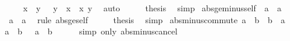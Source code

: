 \begin{isabellebody}
%
\isadelimproof
%
\endisadelimproof
%
\isatagproof
{}\isamarkupfalse%
\ {\isacharminus}{\kern0pt}\isanewline
\ \ \isamarkupfalse%
\ {\isachardoublequoteopen}x\ {\isasymle}\ y\ {\isasymLongrightarrow}\ {\isasymnot}\ y\ {\isacharless}{\kern0pt}\ x{\isachardoublequoteclose}\ \ x\ y\ \isamarkupfalse%
\ auto\isanewline
\ \ \isamarkupfalse%
\ \isamarkupfalse%
\ {\isacharquery}{\kern0pt}thesis\ \isamarkupfalse%
\ simp\isanewline
{}\isamarkupfalse%
%
\endisatagproof
{\isafoldproof}%
%
\isadelimproof
\isanewline
%
\endisadelimproof
\isanewline
{}\isamarkupfalse%
\ abs{\isacharunderscore}{\kern0pt}ge{\isacharunderscore}{\kern0pt}minus{\isacharunderscore}{\kern0pt}self{\isacharcolon}{\kern0pt}\ {\isachardoublequoteopen}{\isacharminus}{\kern0pt}\ a\ {\isasymle}\ {\isasymbar}a{\isasymbar}{\isachardoublequoteclose}\isanewline
%
\isadelimproof
%
\endisadelimproof
%
\isatagproof
{}\isamarkupfalse%
\ {\isacharminus}{\kern0pt}\isanewline
\ \ \isamarkupfalse%
\ {\isachardoublequoteopen}{\isacharminus}{\kern0pt}\ a\ {\isasymle}\ {\isasymbar}{\isacharminus}{\kern0pt}a{\isasymbar}{\isachardoublequoteclose}\ \isamarkupfalse%
\ {\isacharparenleft}{\kern0pt}rule\ abs{\isacharunderscore}{\kern0pt}ge{\isacharunderscore}{\kern0pt}self{\isacharparenright}{\kern0pt}\isanewline
\ \ \isamarkupfalse%
\ \isamarkupfalse%
\ {\isacharquery}{\kern0pt}thesis\ \isamarkupfalse%
\ simp\isanewline
{}\isamarkupfalse%
%
\endisatagproof
{\isafoldproof}%
%
\isadelimproof
\isanewline
%
\endisadelimproof
\isanewline
{}\isamarkupfalse%
\ abs{\isacharunderscore}{\kern0pt}minus{\isacharunderscore}{\kern0pt}commute{\isacharcolon}{\kern0pt}\ {\isachardoublequoteopen}{\isasymbar}a\ {\isacharminus}{\kern0pt}\ b{\isasymbar}\ {\isacharequal}{\kern0pt}\ {\isasymbar}b\ {\isacharminus}{\kern0pt}\ a{\isasymbar}{\isachardoublequoteclose}\isanewline
%
\isadelimproof
%
\endisadelimproof
%
\isatagproof
{}\isamarkupfalse%
\ {\isacharminus}{\kern0pt}\isanewline
\ \ \isamarkupfalse%
\ {\isachardoublequoteopen}{\isasymbar}a\ {\isacharminus}{\kern0pt}\ b{\isasymbar}\ {\isacharequal}{\kern0pt}\ {\isasymbar}{\isacharminus}{\kern0pt}\ {\isacharparenleft}{\kern0pt}a\ {\isacharminus}{\kern0pt}\ b{\isacharparenright}{\kern0pt}{\isasymbar}{\isachardoublequoteclose}\isanewline
\ \ \ \ \isamarkupfalse%
\ {\isacharparenleft}{\kern0pt}simp\ only{\isacharcolon}{\kern0pt}\ abs{\isacharunderscore}{\kern0pt}minus{\isacharunderscore}{\kern0pt}cancel{\isacharparenright}{\kern0pt}\isanewline

\end{isabellebody}
